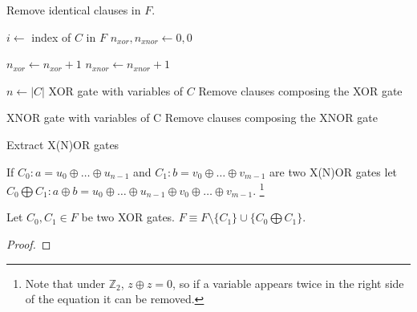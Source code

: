 \begin{algorithm}[h]
  \begin{algorithmic}

    \STATE Remove identical clauses in $F$.

      \STATE $i \gets$ index of $C$ in $F$
      \STATE $n_{xor}, n_{xnor} \gets 0, 0$

          \STATE $n_{xor} \gets n_{xor} + 1$
        \ELSE
          \STATE $n_{xnor} \gets n_{xnor} + 1$
        \ENDIF
      \ENDFOR

      \STATE $n \gets |C|$
        \PRINT XOR gate with variables of $C$
        \STATE Remove clauses composing the XOR gate
      \ENDIF

        \PRINT XNOR gate with variables of C
        \STATE Remove clauses composing the XNOR gate
      \ENDIF
    \ENDFOR
  \end{algorithmic}

  \caption{Extract X(N)OR gates}
  \label{alg:split}
\end{algorithm}


\begin{mydef}
  If $C_0: a = u_0 \oplus \ldots \oplus u_{n-1}$ and $C_1: b =
  v_0 \oplus \ldots \oplus v_{m-1}$ are two X(N)OR gates let $C_0
  \bigoplus C_1: a \oplus b = u_0 \oplus \ldots \oplus u_{n-1}
  \oplus v_0 \oplus \ldots \oplus v_{m-1}$. \footnote{Note that
  under $\mathbb{Z}_2$, $z \oplus z = 0$, so if a variable appears
  twice in the right side of the equation it can be removed.}
\end{mydef}

\begin{myprop}
  \label{myprop:xor-sum}
  Let $C_0, C_1 \in F$ be two XOR gates. $F \equiv F \setminus \{C_1\} \cup
  \{C_0 \bigoplus C_1\}$.
\end{myprop}

\begin{proof}
\end{proof}

